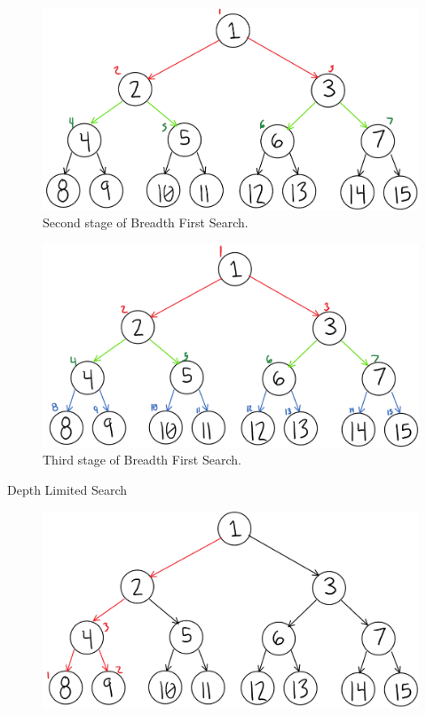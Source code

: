 \documentclass[11pt]{article}
\newenvironment{problem}[2][Problem]{\begin{trivlist}
\item[\hskip \labelsep {\bfseries #1}\hskip \labelsep {\bfseries #2.}]}{\end{trivlist}}
\begin{document}
\begin{problem}{10}
\begin{enumerate}
			\begin{figure}
				\includegraphics[scale=0.4]{BFS_2.PNG}
				\caption{Second stage of Breadth First Search.}
				\label{fig.bfs}
			\end{figure}
			\begin{figure}
				\includegraphics[scale=0.4]{BFS_3.PNG}
				\caption{Third stage of Breadth First Search.}
				\label{fig.bfs}
			\end{figure}
			\newline
			\begin{large}Depth Limited Search\end{large}
			\begin{figure}
				\includegraphics[scale=0.5]{DLS_1.png}

\end{figure}
\end{enumerate}
\end{problem}
\end{document}
